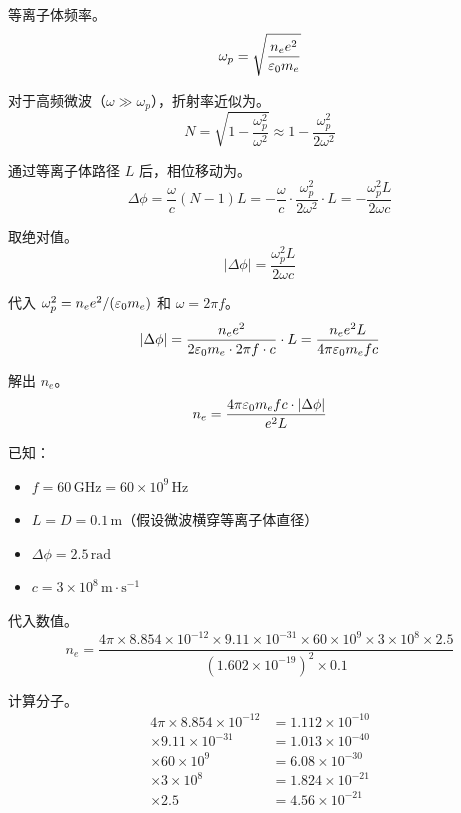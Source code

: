 等离子体频率。
\begin{equation}
    \omega_p = \sqrt{\frac{n_e e^2}{\varepsilon_0 m_e}}
\label{eq:ch12-plasma-frequency}
\end{equation}

对于高频微波（$\omega \gg \omega_p$），折射率近似为。
\begin{equation}
    N = \sqrt{1 - \frac{\omega_p^2}{\omega^2}} \approx 1 - \frac{\omega_p^2}{2\omega^2}
\label{eq:ch12-refractive-index-ex2}
\end{equation}

通过等离子体路径 $L$ 后，相位移动为。
\[
    \Delta\phi = \frac{\omega}{c}(N-1)L = -\frac{\omega}{c}\cdot\frac{\omega_p^2}{2\omega^2}\cdot L = -\frac{\omega_p^2 L}{2\omega c}
\]

取绝对值。
\begin{equation}
    |\Delta\phi| = \frac{\omega_p^2 L}{2\omega c}
\label{eq:ch12-phase-shift}
\end{equation}

代入 $\omega_p^2 = n_e e^2/(\varepsilon_0 m_e)$ 和 $\omega = 2\pi f$。
\[
    |\Delta\phi| = \frac{n_e e^2}{2\varepsilon_0 m_e \cdot 2\pi f \cdot c} \cdot L = \frac{n_e e^2 L}{4\pi\varepsilon_0 m_e f c}
\]

解出 $n_e$。
\begin{equation}
    n_e = \frac{4\pi\varepsilon_0 m_e f c \cdot |\Delta\phi|}{e^2 L}
\label{eq:ch12-density-phase}
\end{equation}

已知：
\begin{itemize}
    \item $f = 60\,\mathrm{GHz} = 60\times10^9\,\mathrm{Hz}$
    \item $L = D = 0.1\,\mathrm{m}$（假设微波横穿等离子体直径）
    \item $\Delta\phi = 2.5\,\mathrm{rad}$
    \item $c = 3\times10^8\,\mathrm{m\cdot s^{-1}}$
\end{itemize}

代入数值。
\[
    n_e = \frac{4\pi \times 8.854\times10^{-12} \times 9.11\times10^{-31} \times 60\times10^9 \times 3\times10^8 \times 2.5}{(1.602\times10^{-19})^2 \times 0.1}
\]

计算分子。
\begin{align*}
    4\pi \times 8.854\times10^{-12} &= 1.112\times10^{-10} \\
    \times 9.11\times10^{-31} &= 1.013\times10^{-40} \\
    \times 60\times10^9 &= 6.08\times10^{-30} \\
    \times 3\times10^8 &= 1.824\times10^{-21} \\
    \times 2.5 &= 4.56\times10^{-21}
\end{align*}

